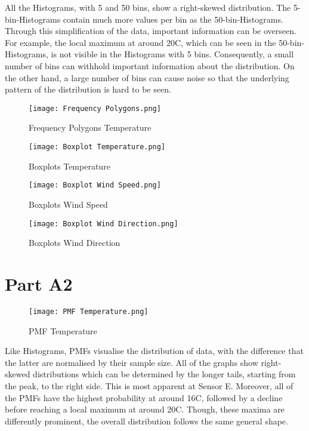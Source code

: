 \documentclass{article}
\begin{document}
All the Histograms, with 5 and 50 bins, show a right-skewed distribution. The 5-bin-Histograms contain much more values per bin as the 50-bin-Histograms. Through this simplification of the data, important information can be overseen. For example, the local maximum at around 20\textdegree{}C, which can be seen in the 50-bin-Histograms, is not visible in the Histograms with 5 bins. Consequently, a small number of bins can withhold important information about the distribution. On the other hand, a large number of bins can cause noise so that the underlying pattern of the distribution is hard to be seen.

\begin{figure} [H]
\centering
  \texttt{[image: Frequency Polygons.png]}
  \caption{Frequency Polygons Temperature}
  \label{fig:Frequency}
\end{figure}

\begin{figure} [H]
  \texttt{[image: Boxplot Temperature.png]}
  \caption{Boxplots Temperature}
  \label{fig:Box_temp}
\end{figure}

\begin{figure} [H]
  \texttt{[image: Boxplot Wind Speed.png]}
  \caption{Boxplots Wind Speed}
  \label{fig:Box_ws}
\end{figure}

\begin{figure} [H]
  \texttt{[image: Boxplot Wind Direction.png]}
  \caption{Boxplots Wind Direction}
  \label{fig:Box_wd}
\end{figure}

\section{Part A2}

\begin{figure} [H]
  \texttt{[image: PMF Temperature.png]}
  \caption{PMF Temperature}
  \label{fig:PMF}
\end{figure}

Like Histograms, PMFs visualise the distribution of data, with the difference that the latter are normalised by their sample size. All of the graphs show right-skewed distributions which can be determined by the longer tails, starting from the peak, to the right side. This is most apparent at Sensor E. Moreover, all of the PMFs have the highest probability at around 16\textdegree{}C, followed by a decline before reaching a local maximum at around 20\textdegree{}C. Though, these maxima are differently prominent, the overall distribution follows the same general shape.
\end{document}
